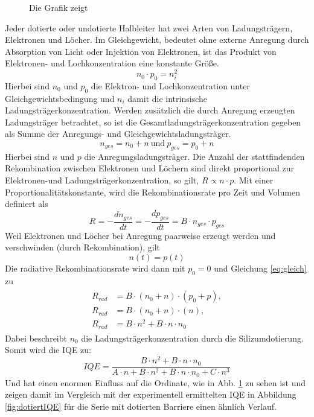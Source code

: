 \begin{figure}[H]
\begin{minipage}[t]{0.49\linewidth}
        \caption{Die Grafik zeigt  }
        \label{fig:iqedot}
    \end{minipage}
\end{figure}
\vspace{0.1cm}
\noindent
Jeder dotierte oder undotierte Halbleiter hat zwei Arten von Ladungsträgern, Elektronen und Löcher.
Im Gleichgewicht, bedeutet ohne externe Anregung durch Absorption von Licht oder Injektion von Elektronen, ist das Produkt von Elektronen- und Lochkonzentration eine konstante Größe.
\begin{equation}
    n_0 \cdot p_0 = n_i^2
    \label{eq:constant}
\end{equation}
Hierbei sind $n_0$ und $p_0$ die Elektron- und Lochkonzentration unter Gleichgewichtsbedingung und $n_{i}$ damit die intrinsische Ladungsträgerkonzentration.
Werden zusätzlich die durch Anregung erzeugten Ladungsträger betrachtet, so ist die Gesamtladungsträgerkonzentration gegeben als Summe der Anregungs- und Gleichgewichtsladungsträger. 
\begin{equation}
    n_{ges} = n_0 + n \medspace \text{und} \medspace  p_{ges} = p_0 +  n 
\end{equation}
Hierbei sind $ n$ und $p$ die Anregungsladungsträger. 
Die Anzahl der stattfindenden Rekombination zwischen Elektronen und Löchern sind direkt proportional zur Elektronen-und Ladungsträgerkonzentration, so gilt, $R \propto n \cdot p $. Mit einer Proportionalitätskonstante, wird die Rekombinationsrate pro Zeit und Volumen definiert als
\begin{equation}
    R = - \frac{dn_{ges}}{dt} = - \frac{dp_{ges}}{dt} = B \cdot n_{ges} \cdot p_{ges}
\end{equation}
Weil Elektronen und Löcher bei Anregung paarweise erzeugt werden und verschwinden (durch Rekombination), gilt
\begin{equation}
    \label{eq:gleich}
    n(t) =  p(t)
\end{equation}
Die radiative Rekombinationsrate wird dann mit $p_{0} = 0$ und Gleichung \ref{eq:gleich} zu
\begin{align}
\begin{split}
    R_{rad} &= B \cdot (n_0 + n)  \cdot (p_0 + p) ,
    \\
    R_{rad} &= B \cdot (n_0 + n) \cdot (n) ,
    \\
    R_{rad} &= B \cdot n^2 + B \cdot n \cdot n_0
\end{split}
\end{align}
Dabei beschreibt $n_{0}$ die Ladungsträgerkonzentration durch die Silizumdotierung. 
Somit wird die IQE zu:
\begin{equation}
    IQE = \frac{B \cdot n^2 + B \cdot n \cdot n_{0}}{A \cdot n + B \cdot n^2  + B \cdot n \cdot n_{0}+ C \cdot n^3} 
    \label{eq:dopediqe}
\end{equation}
Und hat einen enormen Einfluss auf die Ordinate, wie in Abb. \ref{fig:iqedot} zu sehen ist und zeigen damit im Vergleich mit der experimentell ermittelten IQE in Abbildung \ref{fig:dotiertIQE} für die Serie mit dotierten Barriere einen ähnlich Verlauf.

